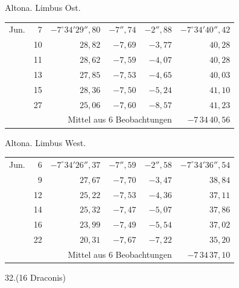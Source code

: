 \noindent\begin{minipage}[t]{.495\textwidth}\centering Altona. Limbus Ost.\par\smallskip
{\scriptsize\setlength{\tabcolsep}{1pt}\renewcommand{\arraystretch}{1.2}\begin{tabular}{lr|r|r|r|r|}
Jun.&7&$-7^\circ34'29''{,}80$&$-7''{,}74$&$-2''{,}88$&$-7^\circ34'40''{,}42$\\
&10&$28{,}82$&$-7{,}69$&$-3{,}77$&$40{,}28$\\
&11&$28{,}62$&$-7{,}59$&$-4{,}07$&$40{,}28$\\
&13&$27{,}85$&$-7{,}53$&$-4{,}65$&$40{,}03$\\
&15&$28{,}36$&$-7{,}50$&$-5{,}24$&$41{,}10$\\
&27&$25{,}06$&$-7{,}60$&$-8{,}57$&$41{,}23$\\
\cline{6-6}\multicolumn{5}{r}{Mittel aus 6 Beobachtungen}&$-7\,34\,40{,}56$
\end{tabular}}\end{minipage}\hfill\begin{minipage}[t]{.495\textwidth}\centering Altona. Limbus West.\par\smallskip
{\scriptsize\setlength{\tabcolsep}{1pt}\renewcommand{\arraystretch}{1.2}\begin{tabular}{lr|r|r|r|r}
Jun.&6&$-7^\circ34'26''{,}37$&$-7''{,}59$&$-2''{,}58$&$-7^\circ34'36''{,}54$\\
&9&$27{,}67$&$-7{,}70$&$-3{,}47$&$38{,}84$\\
&12&$25{,}22$&$-7{,}53$&$-4{,}36$&$37{,}11$\\
&14&$25{,}32$&$-7{,}47$&$-5{,}07$&$37{,}86$\\
&16&$23{,}99$&$-7{,}49$&$-5{,}54$&$37{,}02$\\
&22&$20{,}31$&$-7{,}67$&$-7{,}22$&$35{,}20$\\
\cline{6-6}\multicolumn{5}{r}{Mittel aus 6 Beobachtungen}&$-7\,34\,37{,}10$
\end{tabular}}\end{minipage}
\par\vspace{4mm}
\begin{center}32.\quad (16 Draconis)\end{center}


